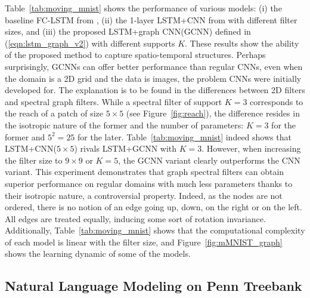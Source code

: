 \documentclass{article} %
\newcommand{\figref}[1]{Figure~\ref{fig:#1}}
\newcommand{\tabref}[1]{Table~\ref{tab:#1}}
\newcommand{\eqnref}[1]{(\ref{eqn:#1})}
\begin{document}
\tabref{moving_mnist} shows the performance of various models: (i) the baseline
FC-LSTM from \citet{convlstm}, (ii) the 1-layer LSTM+CNN from \citet{convlstm}
with different filter sizes, and (iii) the proposed LSTM+graph CNN(GCNN)
defined in \eqnref{lstm_graph_v2} with different supports $K$. These results
show the ability of the proposed method to capture spatio-temporal structures.
Perhaps surprisingly, GCNNs can offer better performance than regular CNNs,
even when the domain is a 2D grid and the data is images, the problem CNNs were
initially developed for. The explanation is to be found in the differences
between 2D filters and spectral graph filters. While a spectral filter of
support $K=3$ corresponds to the reach of a patch of size $5 \times 5$ (see
\figref{reach}), the difference resides in the isotropic nature of the former
and the number of parameters: $K=3$ for the former and $5^2=25$ for the later.
\tabref{moving_mnist} indeed shows that LSTM+CNN($5\times5$) rivals LSTM+GCNN
with $K=3$. However, when increasing the filter size to $9\times9$ or $K=5$,
the GCNN variant clearly outperforms the CNN variant. This experiment
demonstrates that graph spectral filters can obtain superior performance on
regular domains with much less parameters thanks to their isotropic nature, a
controversial property. Indeed, as the nodes are not ordered, there is no
notion of an edge going up, down, on the right or on the left. All edges are
treated equally, inducing some sort of rotation invariance. Additionally,
\tabref{moving_mnist} shows that the computational complexity of each model is
linear with the filter size, and \figref{mMNIST_graph} shows the learning
dynamic of some of the models.

\subsection{Natural Language Modeling on Penn Treebank}
\end{document}

